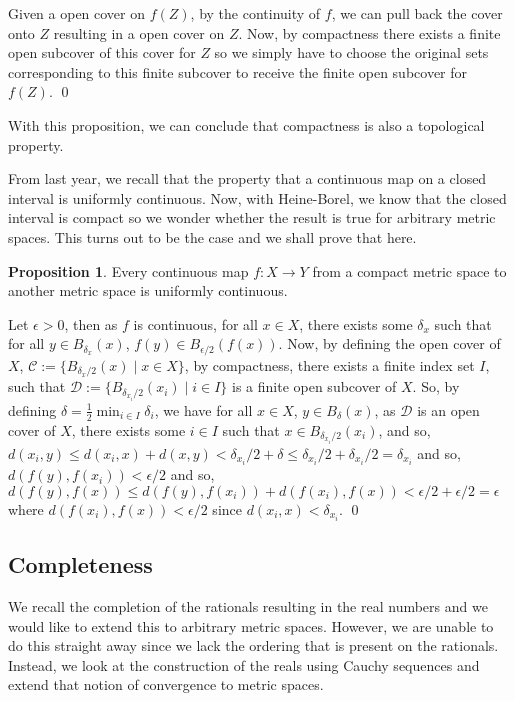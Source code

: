 \documentclass[
]{article}
\theoremstyle{definition}
\newtheorem{prop}{Proposition}
\theoremstyle{definition}
\begin{document}
Given a open cover on \(f(Z)\), by the continuity of \(f\), we can pull
back the cover onto \(Z\) resulting in a open cover on \(Z\). Now, by
compactness there exists a finite open subcover of this cover for \(Z\)
so we simply have to choose the original sets corresponding to this
finite subcover to receive the finite open subcover for \(f(Z)\). \qed

With this proposition, we can conclude that compactness is also a
topological property.

From last year, we recall that the property that a continuous map on a
closed interval is uniformly continuous. Now, with Heine-Borel, we know
that the closed interval is compact so we wonder whether the result is
true for arbitrary metric spaces. This turns out to be the case and we
shall prove that here.

\begin{prop}
  Every continuous map \(f : X \to Y\) from a compact metric space to another 
  metric space is uniformly continuous.
\end{prop}
\proof

Let \(\epsilon > 0\), then as \(f\) is continuous, for all \(x \in X\),
there exists some \(\delta_x\) such that for all
\(y \in B_{\delta_x}(x)\), \(f(y) \in B_{\epsilon / 2}(f(x))\). Now, by
defining the open cover of \(X\),
\(\mathcal{C} := \{B_{\delta_x / 2}(x) \mid x \in X\}\), by compactness,
there exists a finite index set \(I\), such that
\(\mathcal{D} :=  \{B_{\delta_{x_i} / 2}(x_i) \mid i \in I\}\) is a
finite open subcover of \(X\). So, by defining
\(\delta = \frac{1}{2} \min_{i \in I} \delta_i\), we have for all
\(x \in X\), \(y \in B_\delta(x)\), as \(\mathcal{D}\) is an open cover
of \(X\), there exists some \(i \in I\) such that
\(x \in B_{\delta_{x_i} / 2}(x_i)\), and so,
\(d(x_i, y) \le d(x_i, x) + d(x, y) < \delta_{x_i} / 2 + \delta \le  \delta_{x_i} / 2 + \delta_{x_i} / 2 = \delta_{x_i}\)
and so, \(d(f(y), f(x_i)) < \epsilon / 2\) and so,
\(d(f(y), f(x)) \le d(f(y), f(x_i)) +  d(f(x_i), f(x)) < \epsilon / 2 + \epsilon / 2 = \epsilon\)
where \(d(f(x_i), f(x)) < \epsilon / 2\) since
\(d(x_i, x) < \delta_{x_i}\). \qed

\hypertarget{completeness}{%
\subsection{Completeness}\label{completeness}}

We recall the completion of the rationals resulting in the real numbers
and we would like to extend this to arbitrary metric spaces. However, we
are unable to do this straight away since we lack the ordering that is
present on the rationals. Instead, we look at the construction of the
reals using Cauchy sequences and extend that notion of convergence to
metric spaces.
\end{document}
